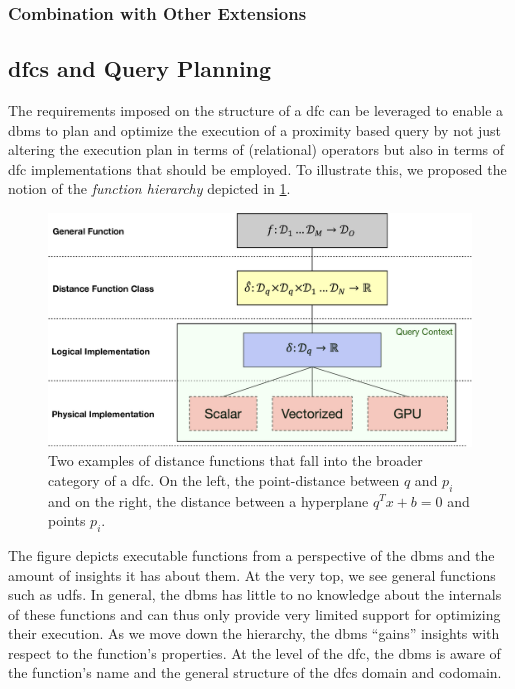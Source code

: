 
\subsubsection{Combination with Other Extensions}


\subsection{\acrshort{dfc}s and Query Planning}
\label{section:dfc_and_planning}

The requirements imposed on the structure of a \acrshort{dfc} can be leveraged to enable a \acrshort{dbms} to plan and optimize the execution of a proximity based query by not just altering the execution plan in terms of (relational) operators but also in terms of \acrshort{dfc} implementations that should be employed. To illustrate this, we proposed the notion of the \emph{function hierarchy} depicted in \ref{figure:function_hierarchy}.

\begin{figure}[bt]
    \centering
    \includegraphics[width=\textwidth]{figures/function_hierarchy.eps}
    \caption{Two examples of distance functions that fall into the broader category of a \acrshort{dfc}. On the left, the point-distance between $q$ and $p_i$ and on the right, the distance between a hyperplane $q^Tx+b = 0$ and points $p_i$.}
    \label{figure:function_hierarchy}
\end{figure}

The figure depicts executable functions from a perspective of the \acrshort{dbms} and the amount of insights it has about them. At the very top, we see general functions such as \acrshort{udf}s. In general, the \acrshort{dbms} has little to no knowledge about the internals of these functions and can thus only provide very limited support for optimizing their execution. As we move down the hierarchy, the \acrshort{dbms} ``gains'' insights with respect to the function's properties. At the level of the \acrshort{dfc}, the \acrshort{dbms} is aware of the function's name and the general structure of the \acrshort{dfc}s domain and codomain. 


